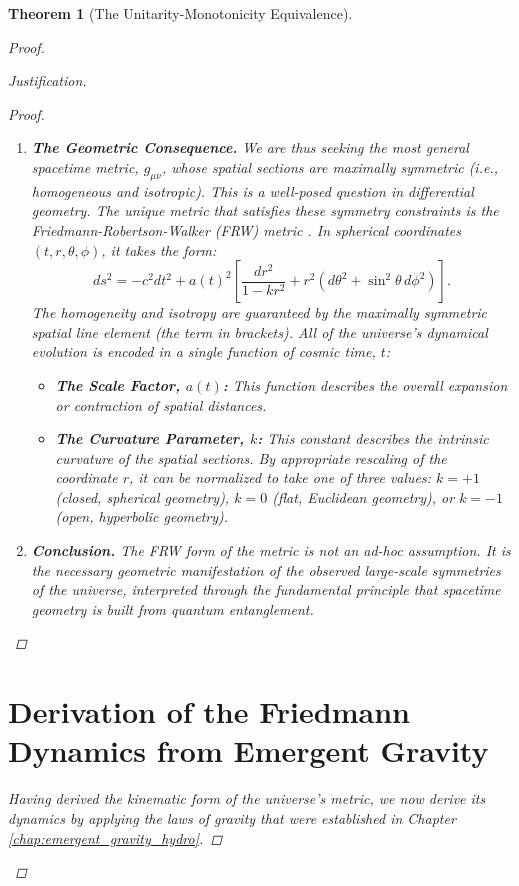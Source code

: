 \documentclass[11pt, letterpaper]{report}
\theoremstyle{plain} %
\newtheorem{theorem}{Theorem}[chapter]
\theoremstyle{definition} %
\theoremstyle{remark} %
\begin{document}
\begin{theorem}[The Unitarity-Monotonicity Equivalence]
\begin{proof}
\begin{proof}[Justification]
\begin{proof}
\begin{enumerate}
    \item \textbf{The Geometric Consequence.} We are thus seeking the most general spacetime metric, $g_{\mu\nu}$, whose spatial sections are maximally symmetric (i.e., homogeneous and isotropic). This is a well-posed question in differential geometry. The unique metric that satisfies these symmetry constraints is the Friedmann-Robertson-Walker (FRW) metric \cite{Friedmann1922,Lemaitre1927,Robertson1935,Walker1937}. In spherical coordinates $(t, r, \theta, \phi)$, it takes the form:
    \begin{equation}
        ds^2 = -c^2 dt^2 + a(t)^2 \left[ \frac{dr^2}{1-kr^2} + r^2(d\theta^2 + \sin^2\theta \, d\phi^2) \right].
        \label{eq:frw_metric_app}
    \end{equation}
    The homogeneity and isotropy are guaranteed by the maximally symmetric spatial line element (the term in brackets). All of the universe's dynamical evolution is encoded in a single function of cosmic time, $t$:
    \begin{itemize}
        \item \textbf{The Scale Factor, $a(t)$:} This function describes the overall expansion or contraction of spatial distances.
        \item \textbf{The Curvature Parameter, $k$:} This constant describes the intrinsic curvature of the spatial sections. By appropriate rescaling of the coordinate $r$, it can be normalized to take one of three values: $k=+1$ (closed, spherical geometry), $k=0$ (flat, Euclidean geometry), or $k=-1$ (open, hyperbolic geometry).
    \end{itemize}

    \item \textbf{Conclusion.} The FRW form of the metric is not an ad-hoc assumption. It is the necessary geometric manifestation of the observed large-scale symmetries of the universe, interpreted through the fundamental principle that spacetime geometry is built from quantum entanglement.
\end{enumerate}
\end{proof}

\section{Derivation of the Friedmann Dynamics from Emergent Gravity}
\label{app:friedmann_eq_derivation}

Having derived the kinematic form of the universe's metric, we now derive its dynamics by applying the laws of gravity that were established in Chapter \ref{chap:emergent_gravity_hydro}.


\end{proof}
\end{proof}
\end{theorem}
\end{document}
